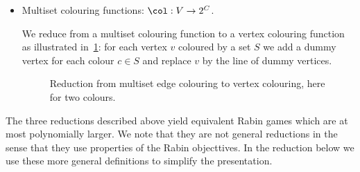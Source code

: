 \begin{itemize}
	\item Multiset colouring functions: $\col : V \to 2^C$.
	
We reduce from a multiset colouring function to a vertex colouring function as illustrated in~\cref{2-fig:reduction_multiset_colouring}: 
for each vertex $v$ coloured by a set $S$ we add a dummy vertex for each colour $c \in S$ and replace $v$ by the line of dummy vertices.

\begin{figure}[!ht]
\centering
\caption{Reduction from multiset edge colouring to vertex colouring, here for two colours.}
\label{2-fig:reduction_multiset_colouring}
\end{figure}
	
\end{itemize}
The three reductions described above yield equivalent Rabin games which are at most polynomially larger.
We note that they are not general reductions in the sense that they use properties of the Rabin objecttives.
In the reduction below we use these more general definitions to simplify the presentation.


